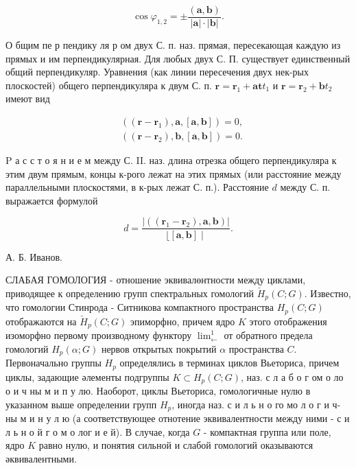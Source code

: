 \documentclass[10pt]{article}
\begin{document}
\[

\cos \varphi_{1,2}= \pm \frac{(\boldsymbol{a}, \boldsymbol{b})}{|\boldsymbol{a}| \cdot|\boldsymbol{b}|} .

\]



О бщим пе р пендику ля р ом двух С. п. наз. прямая, пересекающая каждую из прямых и им перпендикулярная. Для любых двух С. П. существует единственный общий перпендикуляр. Уравнения (как линии пересечения двух нек-рых плоскостей) общего перпендикуляра к двум С. п. $\boldsymbol{r}=\boldsymbol{r}_{1}+\boldsymbol{a t} t_{1}$ и $\boldsymbol{r}=\boldsymbol{r}_{2}+\boldsymbol{b} t_{2}$ имеют вид



\[

\begin{aligned}

& \left(\left(\boldsymbol{r}-\boldsymbol{r}_{1}\right), \boldsymbol{a},[\boldsymbol{a}, \boldsymbol{b}]\right)=0, \\

& \left(\left(\boldsymbol{r}-\boldsymbol{r}_{2}\right), \boldsymbol{b},[\boldsymbol{a}, \boldsymbol{b}]\right)=0 .

\end{aligned}

\]



$\mathrm{P}$ а с с т о я н и е м между С. II. наз. длина отрезка общего перпендикуляра к этим двум прямым, концы к-рого лежат на этих прямых (или расстояние между параллельными плоскостями, в к-рых лежат С. п.). Расстояние $d$ между С. п. выражается формулой



\[

d=\frac{\left|\left(\left(\boldsymbol{r}_{1}-\boldsymbol{r}_{2}\right), \boldsymbol{a}, \boldsymbol{b}\right)\right|}{\lfloor[\boldsymbol{a}, \boldsymbol{b}] \mid} .

\]



А. Б. Иванов.



СЛАБАЯ ГОМОЛОГИЯ - отношение эквивалөнтности между циклами, приводящее к определению групп спектральных гомологий $\check{H}_{p}(C ; G)$. Известно, что гомологии Стинрода - Ситникова компактного пространства $H_{p}(C ; G)$ отображаются на $\check{H}_{p}(C ; G)$ эпиморфно, причем ядро $K$ этого отображения изоморфно первому производному функтору $\lim _{\longleftarrow}^{1}$ от обратного предела гомологий $H_{p}(\alpha ; G)$ нервов открытых покрытий $\alpha$ пространства $C$. Первоначально группы $H_{p}$ определялись в терминах циклов Вьеториса, причем циклы, задающие әлементы подгруппы $K \subset H_{p}(C ; G)$, наз. с л а б о г ом о ло о и ч ны м и п у лю. Наоборот, циклы Вьеториса, гомологичные нулю в указанном выше определении групп $H_{p}$, иногда наз. с и л ь н о го мо л о г и ч- ны м и н у л ю (а соответствующее отнотение эквивалентности между ними - с и л ь н о й г о м о лог и е й). В случае, когда $G$ - компактная группа или поле, ядро $K$ равно нулю, и понятия сильной и слабой гомологий оказываются әквивалентными.
\end{document}
